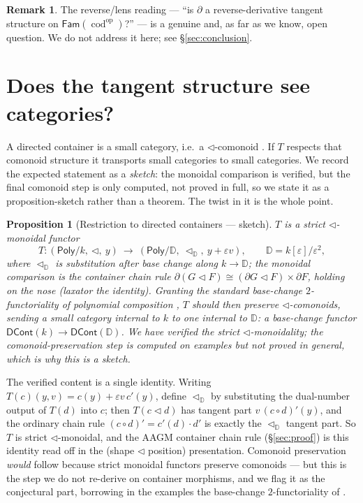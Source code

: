 \documentclass[11pt]{article}
\newtheorem{proposition}[theorem]{Proposition}
\theoremstyle{definition}
\newtheorem{remark}[theorem]{Remark}
\newcommand{\Poly}{\mathsf{Poly}}
\newcommand{\DCont}{\mathsf{DCont}}
\newcommand{\Fam}{\mathsf{Fam}}
\newcommand{\DD}{\mathbb{D}}
\newcommand{\cod}{\operatorname{cod}}
\begin{document}
\begin{remark}
The reverse/lens reading --- ``is $\partial$ a reverse-derivative tangent structure on
$\Fam(\cod^{\mathrm{op}})$?'' --- is a genuine and, as far as we know, open question. We do not
address it here; see \S\ref{sec:conclusion}.
\end{remark}

\section{Does the tangent structure see categories?}\label{sec:directed}

A directed container is a small category, i.e.\ a $\lhd$-comonoid \cite{AhmanUustalu2016}. If $T$
respects that comonoid structure it transports small categories to small categories. We record the
expected statement as a \emph{sketch}: the monoidal comparison is verified, but the final comonoid
step is only computed, not proved in full, so we state it as a proposition-sketch rather than a
theorem. The twist in it is the whole point.

\begin{proposition}[Restriction to directed containers --- sketch]\label{thm:directed}
$T$ is a strict $\lhd$-monoidal functor
\[
  T\colon(\Poly/k,\ \lhd,\ y)\ \longrightarrow\ (\Poly/\DD,\ \lhd_\DD,\ y+\varepsilon v),
  \qquad \DD=k[\varepsilon]/\varepsilon^2,
\]
where $\lhd_\DD$ is substitution after base change along $k\to\DD$; the monoidal comparison is the
container chain rule $\partial(G\lhd F)\cong(\partial G\lhd F)\times\partial F$, holding on the nose
(laxator the identity). \emph{Granting} the standard base-change $2$-functoriality of polynomial
composition \cite{GambinoKock2013}, $T$ should then preserve $\lhd$-comonoids, sending a small
category internal to $k$ to one internal to $\DD$: a base-change functor $\DCont(k)\to\DCont(\DD)$.
We have verified the strict $\lhd$-monoidality; the comonoid-preservation step is computed on
examples but not proved in general, which is why this is a sketch.
\end{proposition}

The verified content is a single identity. Writing $T(c)(y,v)=c(y)+\varepsilon v\,c'(y)$, define
$\lhd_\DD$ by substituting the dual-number output of $T(d)$ into $c$; then $T(c\lhd d)$ has tangent
part $v\,(c\circ d)'(y)$, and the ordinary chain rule $(c\circ d)'=c'(d)\cdot d'$ is exactly the
$\lhd_\DD$ tangent part. So $T$ is strict $\lhd$-monoidal, and the AAGM container chain rule
(\S\ref{sec:proof}) is this identity read off in the (shape $\lhd$ position) presentation. Comonoid
preservation \emph{would} follow because strict monoidal functors preserve comonoids --- but this is
the step we do not re-derive on container morphisms, and we flag it as the conjectural part, borrowing
in the examples the base-change $2$-functoriality of \cite{GambinoKock2013}.
\end{document}
